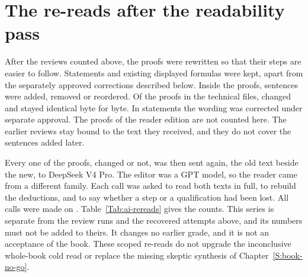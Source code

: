 \section*{The re-reads after the readability pass}

After the reviews counted above, the proofs were rewritten so that their steps
are easier to follow. Statements and existing displayed formulas were kept, apart from the
separately approved corrections described below. Inside the
proofs, sentences were added, removed or reordered. Of the \aiRereadProofs{}
proofs in the \aiRereadFiles{} technical files, \aiRereadChanged{} changed and
\aiRereadUnchanged{} stayed identical byte for byte. In
\aiRereadStatementsChanged{} statements the wording was corrected under
separate approval. The
\aiRereadReaderEditionProofs{} proofs of the reader edition are not counted
here. The earlier reviews stay bound to the text they received, and they do not
cover the sentences added later.

Every one of the \aiRereadProofs{} proofs, changed or not, was then sent
again, the old text beside the new, to DeepSeek V4 Pro. The editor was a GPT
model, so the reader came from a different family. Each call was asked to read
both texts in full, to rebuild the deductions, and to say whether a step or a
qualification had been lost. All calls were made on \aiRereadDay{}.
Table~\ref{Tab:ai-rereads} gives the counts. This series is separate from the
\aiRuns{} review runs and the \aiLaterAttempts{} recovered attempts above, and
its numbers must not be added to theirs. It changes no earlier grade, and it is not an acceptance of the book. These
scoped re-reads do not upgrade the inconclusive whole-book cold read or
replace the missing skeptic synthesis of Chapter~\ref{S:book-no-go}.

